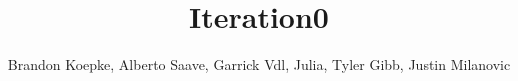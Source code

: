 \begin{frontmatter}
	\title{Iteration0}
	\author{Brandon Koepke, Alberto Saave, Garrick Vdl, Julia, Tyler Gibb, Justin Milanovic}
\end{frontmatter}
\tableofcontents
\clearpage
